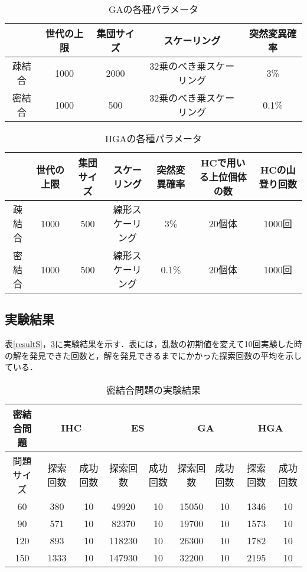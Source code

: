 \documentclass[a4j]{jarticle}
\begin{document}
\begin{table}[H]
 \begin{center}
  \caption{GAの各種パラメータ}
  \label{GApara}
  \begin{tabular}[t]{|c|c|c|c|c|} \hline
   & 世代の上限&集団サイズ& スケーリング& 突然変異確率 \\ \hline \hline
   疎結合& 1000&2000& 32乗のべき乗スケーリング& 3\% \\ \hline
   密結合& 1000&500& 32乗のべき乗スケーリング& 0.1\%\\ \hline
  \end{tabular}
 \end{center}
\end{table}

\begin{table}[H]
 \begin{center}
  \caption{HGAの各種パラメータ}
  \label{HGApara}
  \begin{tabular}[t]{|c|c|c|c|c|c|c|} \hline
   & 世代の上限&集団サイズ& スケーリング& 突然変異確率 &HCで用いる上位個体の数& HCの山登り回数\\ \hline \hline
   疎結合& 1000&500& 線形スケーリング& 3\% & 20個体& 1000回\\ \hline
   密結合& 1000&500& 線形スケーリング& 0.1\%& 20個体& 1000回\\ \hline
  \end{tabular}
 \end{center}
\end{table}

\subsection{実験結果}
表\ref{resultS}，\ref{resultD}に実験結果を示す．表には，乱数の初期値を変えて10回実験した時の解を発見できた回数と，解を発見できるまでにかかった探索回数の平均を示している．
\begin{table}[H]
 \begin{center}
  \caption{密結合問題の実験結果}
  \label{resultD}
  \begin{tabular}[t]{|c|c|c|c|c|c|c|c|c|}\hline
   密結合問題 & \multicolumn{2}{|c|}{IHC} & \multicolumn{2}{|c|}{ES} & \multicolumn{2}{|c|}{GA} & \multicolumn{2}{|c|}{HGA} \\\hline
問題サイズ & 探索回数 & 成功回数 & 探索回数 & 成功回数 & 探索回数 & 成功回数 & 探索回数 & 成功回数 \\\hline\hline
60 & 380 & 10 & 49920 & 10 & 15050 & 10 & 1346 & 10 \\\hline
90 & 571 & 10 & 82370 & 10 & 19700 & 10 & 1573 & 10 \\\hline
120 & 893 & 10 & 118230 & 10 & 26300 & 10 & 1782 & 10 \\\hline
150 & 1333 & 10 & 147930 & 10 & 32200 & 10 & 2195 & 10 \\\hline
  \end{tabular}
 \end{center}
\end{table}
\end{document}
